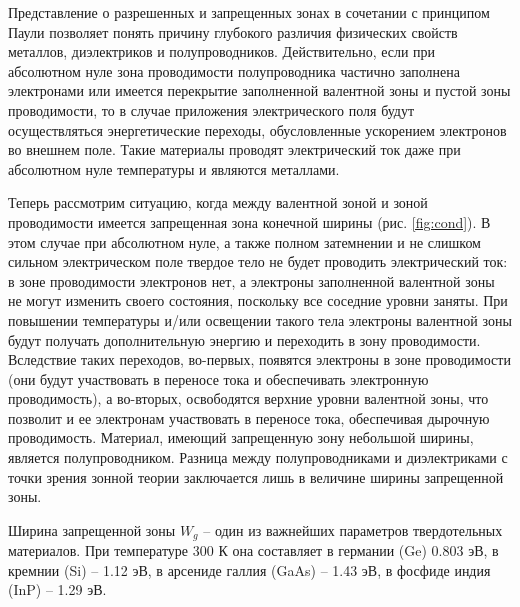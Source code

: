 \documentclass[a4paper,14pt]{extarticle}
\renewcommand{\vec}{\mathbf} %
\begin{document}
Представление о разрешенных и запрещенных зонах в сочетании с принципом Паули позволяет понять причину глубокого
различия физических свойств металлов, диэлектриков и полупроводников. Действительно, если при абсолютном нуле зона
проводимости полупроводника частично заполнена электронами или имеется перекрытие заполненной валентной зоны и пустой
зоны проводимости, то в случае приложения электрического поля будут осуществляться энергетические переходы,
обусловленные ускорением электронов во внешнем поле. Такие материалы проводят электрический ток даже при абсолютном нуле
температуры и являются металлами.  
 
Теперь рассмотрим ситуацию, когда между валентной зоной и зоной проводимости имеется запрещенная зона конечной ширины
(рис. \ref{fig:cond}). В этом случае при абсолютном нуле, а также полном затемнении и не слишком сильном электрическом поле твердое
тело не будет проводить электрический ток: в зоне проводимости электронов нет, а электроны заполненной валентной зоны не
могут изменить своего состояния, поскольку все соседние уровни заняты. При повышении температуры и/или освещении такого
тела электроны валентной зоны будут получать дополнительную энергию и переходить в зону проводимости. Вследствие таких
переходов, во-первых, появятся электроны в зоне проводимости (они будут участвовать в переносе тока и обеспечивать
электронную проводимость), а во-вторых, освободятся верхние уровни валентной зоны, что позволит и ее электронам
участвовать в переносе тока, обеспечивая дырочную проводимость. Материал, имеющий запрещенную зону небольшой ширины,
является полупроводником. Разница между полупроводниками и диэлектриками с точки зрения зонной теории заключается лишь в
величине ширины запрещенной зоны.

Ширина запрещенной зоны $W_g$  – один из важнейших параметров твердотельных материалов.
При температуре 300 К она составляет в германии (Ge) 0.803 эВ, в кремнии (Si) – 1.12 эВ, в арсениде галлия (GaAs) – 1.43
эВ, в фосфиде индия (InP) – 1.29 эВ.


\end{document}
